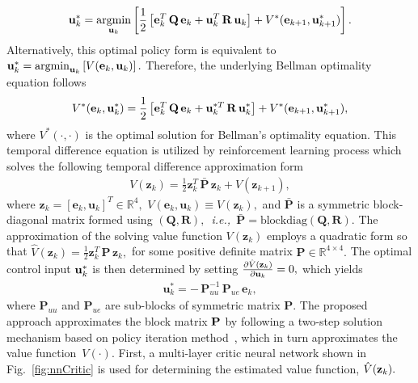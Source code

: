 \documentclass[conference]{IEEEtran}
\DeclareMathOperator*{\argmin}{arg min}
\begin{document}
 \begin{align*}
   {\bf u}^*_k = \argmin_{{\bf u}_k}\left[\frac{1}{2}\left[{\bf e}^T_k\,  {\bf Q}\, {\bf e}_k +{\bf u}^T_k\,  {\bf R} \,  {\bf u}_k\right]   +
   V^*({\bf e}_{k+1},{\bf u}_{k+1}^*)\right].
   \label{eq:argMinControlAction}
 \end{align*}
 Alternatively, this optimal  policy form is equivalent to ${\bf u}^*_k = \argmin_{{\bf u}_k}\left[
 V({\bf e}_{k},{\bf u}_{k})\right].$ 
 Therefore, the underlying Bellman optimality equation follows %
 \begin{equation*}
 \label{eq:BellOpt}
 V^*({\bf e}_k,{\bf u}^*_k)= \frac{1}{2}\left[{\bf e}_k^T\, {\bf Q}\, {\bf e}_k + {\bf u}_k^{*T}\, {\bf R}\, {\bf u}^*_k\right] +V^*({\bf e}_{k+1},{\bf u}^*_{k+1}),
 \end{equation*}
 where $V^*(\cdot,\cdot)$ is the optimal solution for Bellman's optimality equation. This temporal difference equation is utilized by reinforcement learning process which solves the following temporal difference approximation form %
 \begin{align}
   V(\mathbf{z}_k) = \frac{1}{2}\mathbf{z}_k^T\, \bar{\mathbf{P}}\, \mathbf{z}_k + V(\mathbf{z}_{k+1}),
 \label{eq:valueFunctionEstimated}
 \end{align}
 where $\mathbf{z}_k = \left[\mathbf{e}_k ,\mathbf{u}_k\right]^T\in\mathbb{R}^4,$ $V\left(\mathbf{e}_k,\mathbf{u}_k\right) \equiv V(\mathbf{z}_k),$  and $\bar{\mathbf{P}}$ is a symmetric block-diagonal matrix formed using $(\mathbf{Q},\mathbf{R}),$~\textit{i.e.,~}$\bar{\mathbf{P}} = \mathrm{blockdiag}(\mathbf{Q},\mathbf{R}).$ %
 The approximation of the solving value function $V(\mathbf{z}_k)$ employs a quadratic form so that $\hat{V}(\mathbf{z}_k)=\frac{1}{2}\mathbf{z}_k^T\, \mathbf{P}\, \mathbf{z}_k,$ for some positive definite matrix  $\mathbf{P}\in\mathbb{R}^{4\times 4}.$ The optimal control input ${\bf u}_k^*$ is then determined by setting $\frac{\partial\hat{V}({\bf z}_k)}{\partial{\bf u}_k} = 0,$ which yields %
 \begin{align}
 \label{eq:modelFreePolicy}    
 \mathbf{u}_k^* = -\,  \mathbf{P}_{uu}^{-1}\, \mathbf{P}_{ue}\, \mathbf{e}_k,
 \end{align}
 where $\mathbf{P}_{uu}$ and $\mathbf{P}_{ue}$ are sub-blocks of symmetric matrix $\mathbf{P}.$ The proposed approach approximates the block matrix ${\bf P}$ by following a two-step solution mechanism based on policy iteration method~\cite{sutton2020reinforcement}, which in turn approximates the value function~$V(\cdot).$ First, a multi-layer critic neural network shown in Fig.~\ref{fig:nnCritic} is used for determining the estimated value function, $\hat V({\bf z}_k).$
\end{document}
